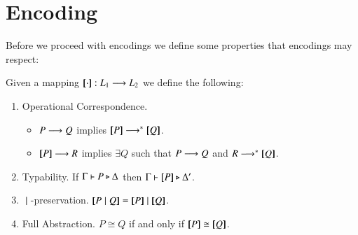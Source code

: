 \section{Encoding}

Before we proceed with encodings we define some properties
that encodings may respect:
\begin{definition}
	Given a mapping $[\!\![\cdot]\!\!]: L_1 \longrightarrow L_2$ we
	define the following:
	\begin{enumerate}
		\item	Operational Correspondence.
			\begin{itemize}
				\item	$P \longrightarrow Q$ implies $\map{P} \red^* \map{Q}$.
				\item	$[\!\![P]\!\!] \longrightarrow R$ implies $\exists Q$ such that $P \longrightarrow Q$ and $R \longrightarrow^* [\!\![Q]\!\!]$.	
			\end{itemize}
		\item	Typability. If $\Gamma \vdash P \triangleright \Delta$ then $\Gamma \vdash [\!\![P]\!\!] \triangleright \Delta'$.

		\item	$\;|\;$-preservation. $\map{P \Par Q} = \map{P} \Par \map{Q}$.

		\item	Full Abstraction. $P \cong Q$ if and only if $\map{P} \cong \map{Q}$.
	\end{enumerate}
\end{definition}

